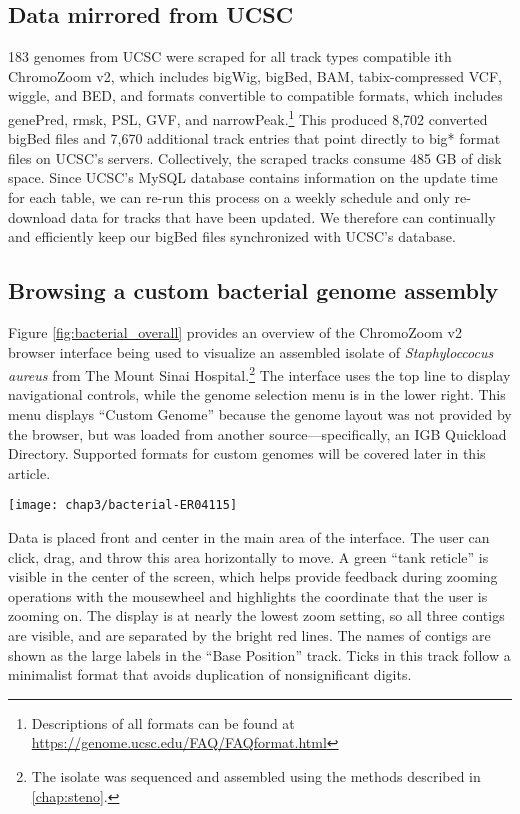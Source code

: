 \subsection{Data mirrored from UCSC}

183 genomes from UCSC were scraped for all track types compatible ith ChromoZoom v2, which includes bigWig, bigBed, BAM, tabix-compressed VCF,\autocite{Danecek2011,Li2011} wiggle, and BED, and formats convertible to compatible formats, which includes genePred, rmsk, PSL, GVF, and narrowPeak.\footnote{Descriptions of all formats can be found at \url{https://genome.ucsc.edu/FAQ/FAQformat.html}} This produced 8,702 converted bigBed files and 7,670 additional track entries that point directly to big* format files on UCSC's servers. Collectively, the scraped tracks consume 485 GB of disk space. Since UCSC's MySQL database contains information on the update time for each table, we can re-run this process on a weekly schedule and only re-download data for tracks that have been updated. We therefore can continually and efficiently keep our bigBed files synchronized with UCSC's database.

\subsection{Browsing a custom bacterial genome assembly}

Figure \ref{fig:bacterial_overall} provides an overview of the ChromoZoom v2 browser interface being used to visualize an assembled isolate of \emph{Staphyloccocus aureus} from The Mount Sinai Hospital.\footnote{The isolate was sequenced and assembled using the methods described in \autoref{chap:steno}.} The interface uses the top line to display navigational controls, while the genome selection menu is in the lower right. This menu displays ``Custom Genome'' because the genome layout was not provided by the browser, but was loaded from another source—specifically, an IGB Quickload Directory. Supported formats for custom genomes will be covered later in this article.

\begin{figure*}[htb]
  \texttt{[image: chap3/bacterial-ER04115]}               
  \caption[Browsing a completed \emph{S. aureus} assembly with two plasmids]{Browsing a completed \emph{S. aureus} assembly with two plasmids (leftmost and rightmost small contigs).}
  \label{fig:bacterial_overall}
\end{figure*}

Data is placed front and center in the main area of the interface. The user can click, drag, and throw this area horizontally to move. A green ``tank reticle'' is visible in the center of the screen, which helps provide feedback during zooming operations with the mousewheel and highlights the coordinate that the user is zooming on. The display is at nearly the lowest zoom setting, so all three contigs are visible, and are separated by the bright red lines. The names of contigs are shown as the large labels in the ``Base Position'' track. Ticks in this track follow a minimalist format that avoids duplication of nonsignificant digits.\autocite{Krzywinski2013}

